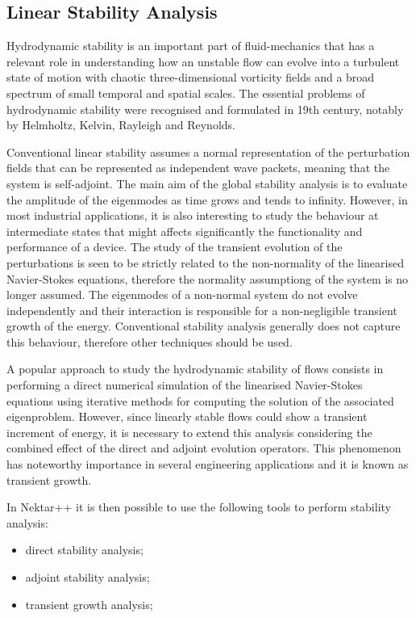 \subsection{Linear Stability Analysis}

Hydrodynamic stability is an important part of fluid-mechanics that has a relevant role in understanding how an unstable flow can evolve into a turbulent state of motion with chaotic three-dimensional vorticity fields and a broad spectrum of small temporal and spatial scales. The essential problems of hydrodynamic stability were recognised and formulated in 19th century, notably by Helmholtz, Kelvin, Rayleigh and Reynolds.

Conventional linear stability assumes a normal representation of the perturbation fields that can be represented as independent wave packets, meaning that the system is self-adjoint. The main aim of the global stability analysis is to evaluate the amplitude of the eigenmodes as time grows and tends to infinity. However, in most industrial applications, it is also interesting to study the behaviour at intermediate states that might affects significantly the functionality and performance of a device. The study of the transient evolution of the perturbations is seen to be strictly related to the non-normality of the linearised Navier-Stokes equations, therefore the normality assumptiong of the system is no longer assumed. The eigenmodes of a non-normal system do not evolve independently and their interaction is responsible for a non-negligible transient growth of the energy. Conventional stability analysis generally does not capture this behaviour, therefore other techniques should be used.

A popular approach to study the hydrodynamic stability of flows consists in performing a direct numerical simulation of the linearised Navier-Stokes equations using iterative methods for computing the solution of the associated eigenproblem. However, since linearly stable flows could show a transient increment of energy, it is necessary to extend this analysis considering the combined effect of the direct and adjoint evolution operators. This phenomenon has noteworthy importance in several engineering applications and it is known as transient growth.

In Nektar++ it is then possible to use the following tools to perform stability analysis: 

\begin{itemize}
\item direct stability analysis;
\item adjoint stability analysis;
\item  transient growth analysis;
\end{itemize}

